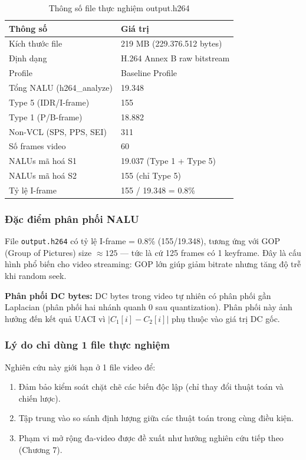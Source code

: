 \begin{table}[ht]
\centering
\caption{Thông số file thực nghiệm output.h264}
\label{tab:dataset}
\begin{tabular}{ll}
\toprule
Thông số & Giá trị \\
\midrule
Kích thước file          & 219 MB (229.376.512 bytes) \\
Định dạng                & H.264 Annex B raw bitstream \\
Profile                  & Baseline Profile \\
Tổng NALU (h264\_analyze) & 19.348 \\
Type 5 (IDR/I-frame)      & 155 \\
Type 1 (P/B-frame)        & 18.882 \\
Non-VCL (SPS, PPS, SEI)  & 311 \\
Số frames video           & 60 \\
NALUs mã hoá S1           & 19.037 (Type 1 + Type 5) \\
NALUs mã hoá S2           & 155 (chỉ Type 5) \\
Tỷ lệ I-frame             & 155 / 19.348 = 0.8\% \\
\bottomrule
\end{tabular}
\end{table}

\subsubsection{Đặc điểm phân phối NALU}

File \texttt{output.h264} có tỷ lệ I-frame = 0.8\% (155/19.348), tương ứng
với GOP (Group of Pictures) size $\approx 125$ --- tức là cứ 125 frames có 1 keyframe.
Đây là cấu hình phổ biến cho video streaming: GOP lớn giúp giảm bitrate
nhưng tăng độ trễ khi random seek.

\textbf{Phân phối DC bytes:}
DC bytes trong video tự nhiên có phân phối gần Laplacian (phân phối hai nhánh
quanh 0 sau quantization). Phân phối này ảnh hưởng đến kết quả UACI vì
$|C_1[i] - C_2[i]|$ phụ thuộc vào giá trị DC gốc.

\subsubsection{Lý do chỉ dùng 1 file thực nghiệm}

Nghiên cứu này giới hạn ở 1 file video để:
\begin{enumerate}
  \item Đảm bảo kiểm soát chặt chẽ các biến độc lập (chỉ thay đổi thuật toán và chiến lược).
  \item Tập trung vào so sánh định lượng giữa các thuật toán trong cùng điều kiện.
  \item Phạm vi mở rộng đa-video được đề xuất như hướng nghiên cứu tiếp theo (Chương 7).
\end{enumerate}

